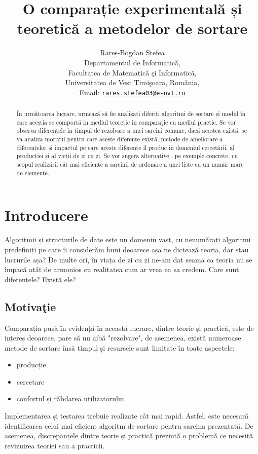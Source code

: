 \documentclass[12pt]{article}
\title{O comparație experimentală și
teoretică a metodelor de sortare}
\author{Rareș-Bogdan Ștefea\\
Departamentul de Informatică,\\
Facultatea de Matematică şi Informatică,\\
Universitatea de Vest Timişoara, România, \\
Email: \href{mailto:rares.stefea03@e-uvt.ro}{\texttt{rares.stefea03@e-uvt.ro}}
}
\begin{document}
\maketitle
\begin{abstract}
În următoarea lucrare, urmează să fie analizați diferiți algoritmi de sortare și modul în care aceștia se comportă in mediul teoretic în comparație cu mediul practic. Se vor observa diferențele în timpul de rezolvare a unei sarcini comune, dacă acestea există, se va analiza motivul pentru care aceste diferențe există, metode de ameliorare a diferențelor  și impactul pe care aceste diferențe îl produc în domeniul cercetării, al producției și al vieții de zi cu zi. Se vor sugera alternative , pe exemple concrete, cu scopul realizării cât mai eficiente a sarcinii de ordonare a unei liste cu un număr mare de elemente.
\end{abstract}

\pagebreak
\tableofcontents
\listoftables
\pagebreak


\section{Introducere}
 \label{sec:introducere}

 Algoritmii și structurile de date este un domeniu vast, cu nenumărați algoritmi predefiniți pe care îi considerăm buni deoarece așa ne dictează teoria, dar stau lucrurile așa? De multe ori, în viața de zi cu zi ne-am dat seama ca teoria nu se împacă atât de armonios cu realitatea cum ar vrea ea sa credem. Care sunt diferențele? Există ele?

\subsection{Motivaţie}

Comparația pusă în evidență în această lucrare, dintre teorie și practică, este de interes deoarece, pare să nu aibă "rezolvare", de asemenea, există numeroase metode de sortare însă timpul și resursele sunt limitate în toate aspectele:
\begin{itemize}
\item producție
\item cercetare 
\item confortul și răbdarea utilizatorului
\end{itemize}
Implementarea și testarea trebuie realizate cât mai rapid. Astfel, este necesară identificarea celui mai eficient algoritm de sortare pentru sarcina prezentată. De asemenea, discrepanțele dintre teorie și practică prezintă o problemă ce necesită revizuirea teoriei sau a practicii.
\end{document}
